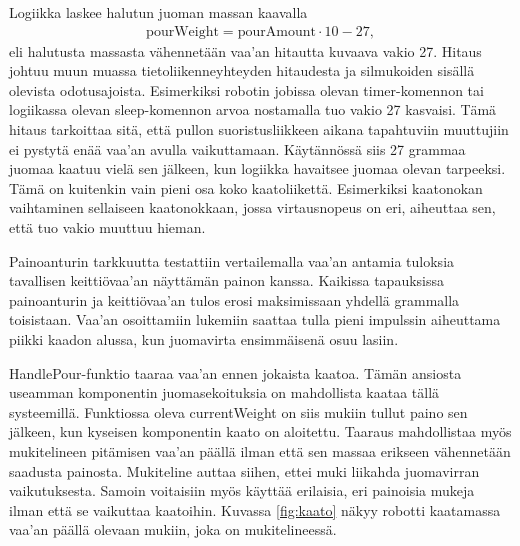 Logiikka laskee halutun juoman massan kaavalla
\begin{align}
    \mathrm{pourWeight} = \mathrm{pourAmount} \cdot 10 - 27 \mathrm{,}
\end{align}
eli halutusta massasta vähennetään vaa'an hitautta kuvaava vakio 27. Hitaus johtuu muun muassa tietoliikenneyhteyden hitaudesta ja silmukoiden sisällä olevista odotusajoista. Esimerkiksi robotin jobissa olevan timer-komennon tai logiikassa olevan sleep-komennon arvoa nostamalla tuo vakio 27 kasvaisi. Tämä hitaus tarkoittaa sitä, että pullon suoristusliikkeen aikana tapahtuviin muuttujiin ei pystytä enää vaa'an avulla vaikuttamaan. Käytännössä siis 27 grammaa juomaa kaatuu vielä sen jälkeen, kun logiikka havaitsee juomaa olevan tarpeeksi. Tämä on kuitenkin vain pieni osa koko kaatoliikettä. Esimerkiksi kaatonokan vaihtaminen sellaiseen kaatonokkaan, jossa virtausnopeus on eri, aiheuttaa sen, että tuo vakio muuttuu hieman.

Painoanturin tarkkuutta testattiin vertailemalla vaa'an antamia tuloksia tavallisen keittiövaa'an näyttämän painon kanssa. Kaikissa tapauksissa painoanturin ja keittiövaa'an tulos erosi maksimissaan yhdellä grammalla toisistaan. Vaa'an osoittamiin lukemiin saattaa tulla pieni impulssin aiheuttama piikki kaadon alussa, kun juomavirta ensimmäisenä osuu lasiin.

HandlePour-funktio taaraa vaa'an ennen jokaista kaatoa. Tämän ansiosta useamman komponentin juomasekoituksia on mahdollista kaataa tällä systeemillä. Funktiossa oleva currentWeight on siis mukiin tullut paino sen jälkeen, kun kyseisen komponentin kaato on aloitettu. Taaraus mahdollistaa myös mukitelineen pitämisen vaa'an päällä ilman että sen massaa erikseen vähennetään saadusta painosta. Mukiteline auttaa siihen, ettei muki liikahda juomavirran vaikutuksesta. Samoin voitaisiin myös käyttää erilaisia, eri painoisia mukeja ilman että se vaikuttaa kaatoihin. Kuvassa \ref{fig:kaato} näkyy robotti kaatamassa vaa'an päällä olevaan mukiin, joka on mukitelineessä.

\newpage

